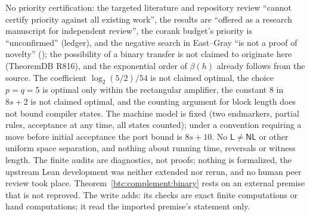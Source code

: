 \begin{writenote}
No priority certification: the targeted literature and repository review
``cannot certify priority against all existing work'', the results are
``offered as a research manuscript for independent review'', the corank
budget's priority is ``unconfirmed'' (ledger), and the negative search in
East--Gray ``is not a proof of novelty'' (); the
possibility of a binary transfer is not claimed to originate here (TheoremDB
R816), and the exponential order of $\beta(h)$ already follows from the
source. The coefficient $\log_2(5/2)/54$ is not claimed optimal, the choice
$p=q=5$ is optimal only within the rectangular amplifier, the constant $8$ in
$8s+2$ is not claimed optimal, and the counting argument for block length
does not bound compiler states. The machine model is fixed (two endmarkers,
partial rules, acceptance at any time, all states counted); under a
convention requiring a move before initial acceptance the port bound is
$8s+10$. No $\mathsf L\ne\mathsf{NL}$ or other uniform space separation, and
nothing about running time, reversals or witness length. The finite audits
are diagnostics, not proofs; nothing is formalized, the upstream Lean
development was neither extended nor rerun, and no human peer review took
place. Theorem~\ref{btc:complement:binary} rests on an external premise that
is not reproved. The write adds: its checks are exact finite computations or
hand computations; it read the imported premise's statement only.
\end{writenote}
